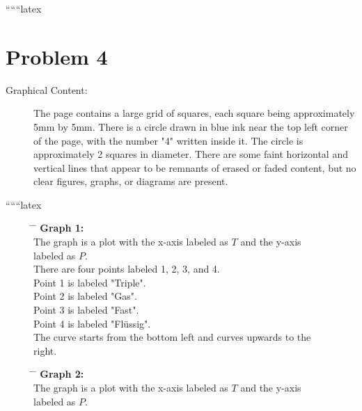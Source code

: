 
``````latex


\section*{Problem 4}

\begin{description}
    \item[Graphical Content:] 
    The page contains a large grid of squares, each square being approximately 5mm by 5mm. There is a circle drawn in blue ink near the top left corner of the page, with the number "4" written inside it. The circle is approximately 2 squares in diameter. There are some faint horizontal and vertical lines that appear to be remnants of erased or faded content, but no clear figures, graphs, or diagrams are present.
\end{description}

``````latex


\begin{figure}[h]
    \centering
    \begin{minipage}{0.4\textwidth}
        \centering
        \begin{tabbing}
            \hspace{2cm} \= \hspace{2cm} \= \kill
            \textbf{Graph 1:} \\
            \> The graph is a plot with the x-axis labeled as $T$ and the y-axis labeled as $P$. \\
            \> There are four points labeled 1, 2, 3, and 4. \\
            \> Point 1 is labeled "Triple". \\
            \> Point 2 is labeled "Gas". \\
            \> Point 3 is labeled "Fast". \\
            \> Point 4 is labeled "Flüssig". \\
            \> The curve starts from the bottom left and curves upwards to the right. \\
        \end{tabbing}
    \end{minipage}
\end{figure}

\begin{figure}[h]
    \centering
    \begin{minipage}{0.4\textwidth}
        \centering
        \begin{tabbing}
            \hspace{2cm} \= \hspace{2cm} \= \kill
            \textbf{Graph 2:} \\
            \> The graph is a plot with the x-axis labeled as $T$ and the y-axis labeled as $P$. \\
        \end{tabbing}
    \end{minipage}
\end{figure}

